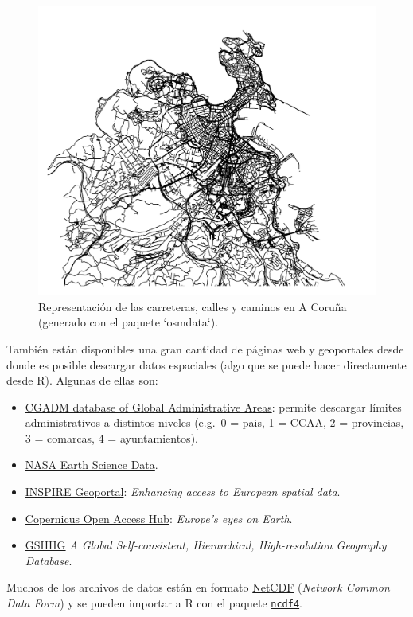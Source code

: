 \documentclass[
  spanish,
]{book}
\theoremstyle{break}
\theoremstyle{definition}
\theoremstyle{definition}
\theoremstyle{definition}
\theoremstyle{definition}
\theoremstyle{remark}
\begin{document}
\begin{figure}[!htb]

{\centering \includegraphics[width=0.7\linewidth]{images/osmdata-1} 

}

\caption{Representación de las carreteras, calles y caminos en A Coruña (generado con el paquete `osmdata`).}\label{fig:osm-coru-plot}
\end{figure}

También están disponibles una gran cantidad de páginas web y geoportales desde donde es posible descargar datos espaciales (algo que se puede hacer directamente desde R).
Algunas de ellas son:

\begin{itemize}
\item
  \href{https://www.gadm.org}{CGADM database of Global Administrative Areas}: permite descargar límites administrativos a distintos niveles (e.g.~0 = pais, 1 = CCAA, 2 = provincias, 3 = comarcas, 4 = ayuntamientos).
\item
  \href{https://earthdata.nasa.gov}{NASA Earth Science Data}.
\item
  \href{https://inspire-geoportal.ec.europa.eu}{INSPIRE Geoportal}: \emph{Enhancing access to European spatial data}.
\item
  \href{https://scihub.copernicus.eu}{Copernicus Open Access Hub}: \emph{Europe's eyes on Earth}.
\item
  \href{http://www.soest.hawaii.edu/pwessel/gshhg/index.html}{GSHHG} \emph{A Global Self-consistent, Hierarchical, High-resolution Geography Database}.
\end{itemize}

Muchos de los archivos de datos están en formato \href{https://www.unidata.ucar.edu/software/netcdf}{NetCDF} (\emph{Network Common Data Form}) y se pueden importar a R con el paquete \href{http://cirrus.ucsd.edu/~pierce/ncdf}{\texttt{ncdf4}}.
\end{document}
